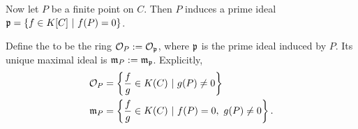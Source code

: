 Now let $P$ be a finite point on $C$. Then $P$ induces a prime ideal
$\frak p = \{ f \in K[C] ~|~ f(P) = 0 \}$.
\begin{comment}
\begin{proposition}
  Let $P$ be an affine point on a curve $C$ and let
  \[ \frak p = \{ f \in K[C] ~|~ f(P) = 0 \}. \]
  Then $\frak p$ is a non-zero prime ideal of $K[C]$.
\end{proposition}
\begin{proof}
  \begin{description}
    \item[$\frak p$ is non-zero:]
      Let $P = (x_0, y_0)$.
      Then $x_0$ is an element of some finite algebraic extension $L$ of $K$.
      Let $m(x)$ be the minimal polynomial of $x_0$.
      Then $m(x) \in K[x]$ is univariate, non-zero, and may be viewed instead as $m(x,y) \in K[x,y]$.
      Then $m(x_0, y_0) = m(x_0) = 0$, hence $m(x,y) \in \frak p$.
    \item[$\frak p$ is prime:]
      Suppose $fg \in \frak p$. Then
      \begin{align*}
        & (fg)(P) = 0 \\
        \implies & f(P)g(P) = 0 \\
        \implies & f(P) = 0 \text{ or } g(P) = 0 \\
        \implies & f \in \frak p \text{ or } g \in \frak p.
      \end{align*}
  \end{description}
\end{proof}
\end{comment}
Define the  to be the ring $\cal O_P := \cal O_{\frak p}$,
where $\frak p$ is the prime ideal induced by $P$.
Its unique maximal ideal is $\frak m_P := \frak m_{\frak p}$. Explicitly,
\begin{align*}
  \cal O_P &= \left\{ \frac f g \in K(C) ~|~ g(P) \neq 0 \right\} \\
  \frak m_P &= \left\{ \frac f g \in K(C) ~|~ f(P) = 0, ~g(P) \neq 0 \right\}.
\end{align*}

